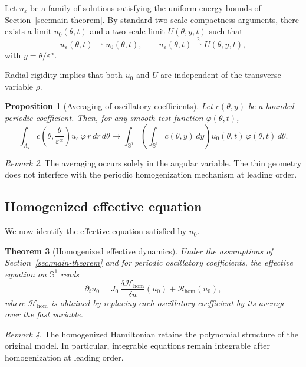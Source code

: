 \documentclass[11pt]{amsart}
\theoremstyle{plain}
\newtheorem{theorem}{Theorem}[section]
\newtheorem{proposition}[theorem]{Proposition}
\theoremstyle{definition}
\theoremstyle{remark}
\newtheorem{remark}[theorem]{Remark}
\theoremstyle{remark}
\begin{document}
Let $u_\varepsilon$ be a family of solutions satisfying the uniform energy bounds
of Section~\ref{sec:main-theorem}.
By standard two-scale compactness arguments, there exists a limit
$u_0(\theta,t)$ and a two-scale limit $U(\theta,y,t)$ such that
\[
u_\varepsilon(\theta,t)
\rightharpoonup
u_0(\theta,t),
\qquad
u_\varepsilon(\theta,t)
\stackrel{2}{\rightharpoonup}
U(\theta,y,t),
\]
with $y=\theta/\varepsilon^\alpha$.

Radial rigidity implies that both $u_0$ and $U$ are independent of the transverse
variable $\rho$.

\begin{proposition}[Averaging of oscillatory coefficients]
\label{prop:averaging}
Let $c(\theta,y)$ be a bounded periodic coefficient.
Then, for any smooth test function $\varphi(\theta,t)$,
\[
\int_{A_\varepsilon}
c\!\left(\theta,\frac{\theta}{\varepsilon^\alpha}\right)
u_\varepsilon\,\varphi
\,r\,dr\,d\theta
\longrightarrow
\int_{\mathbb S^1}
\left(\int_{\mathbb S^1} c(\theta,y)\,dy\right)
u_0(\theta,t)\,\varphi(\theta,t)\,d\theta.
\]
\end{proposition}

\begin{remark}
The averaging occurs solely in the angular variable.
The thin geometry does not interfere with the periodic homogenization mechanism
at leading order.
\end{remark}

\subsection{Homogenized effective equation}

We now identify the effective equation satisfied by $u_0$.

\begin{theorem}[Homogenized effective dynamics]
\label{thm:homogenized}
Under the assumptions of Section~\ref{sec:main-theorem} and for periodic
oscillatory coefficients,
the effective equation on $\mathbb S^1$ reads
\[
\partial_t u_0
=
J_0\,
\frac{\delta \mathcal H_{\mathrm{hom}}}{\delta u}(u_0)
+
\mathcal R_{\mathrm{hom}}(u_0),
\]
where $\mathcal H_{\mathrm{hom}}$ is obtained by replacing each oscillatory
coefficient by its average over the fast variable.
\end{theorem}

\begin{remark}
The homogenized Hamiltonian retains the polynomial structure of the original
model.
In particular, integrable equations remain integrable after homogenization at
leading order.
\end{remark}
\end{document}
